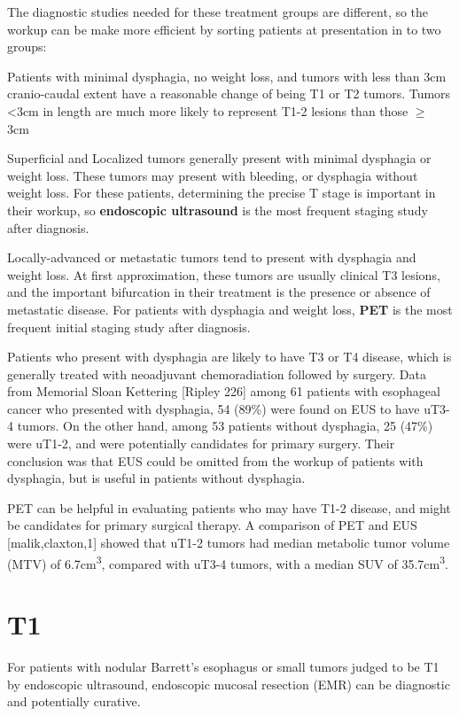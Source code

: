 \documentclass[
]{book}
\begin{document}
The diagnostic studies needed for these treatment groups are different, so the workup can be make more efficient by sorting patients at presentation in to two groups:

Patients with minimal dysphagia, no weight loss, and tumors with less than 3cm cranio-caudal extent have a reasonable change of being T1 or T2 tumors. Tumors \textless3cm in length are much more likely to represent T1-2 lesions than those \(\geq\) 3cm\citep{hollis1116}

Superficial and Localized tumors generally present with minimal dysphagia or weight loss. These tumors may present with bleeding, or dysphagia without weight loss. For these patients, determining the precise T stage is important in their workup, so \textbf{endoscopic ultrasound} is the most frequent staging study after diagnosis.

Locally-advanced or metastatic tumors tend to present with dysphagia and weight loss. At first approximation, these tumors are usually clinical T3 lesions, and the important bifurcation in their treatment is the presence or absence of metastatic disease. For patients with dysphagia and weight loss, \textbf{PET} is the most frequent initial staging study after diagnosis.

Patients who present with dysphagia are likely to have T3 or T4 disease, which is generally treated with neoadjuvant chemoradiation followed by surgery. Data from Memorial Sloan Kettering {[}Ripley 226{]} among 61 patients with esophageal cancer who presented with dysphagia, 54 (89\%) were found on EUS to have uT3-4 tumors. On the other hand, among 53 patients without dysphagia, 25 (47\%) were uT1-2, and were potentially candidates for primary surgery. Their conclusion was that EUS could be omitted from the workup of patients with dysphagia, but is useful in patients without dysphagia.

PET can be helpful in evaluating patients who may have T1-2 disease, and might be candidates for primary surgical therapy. A comparison of PET and EUS {[}malik,claxton,1{]} showed that uT1-2 tumors had median metabolic tumor volume (MTV) of 6.7cm\textsuperscript{3}, compared with uT3-4 tumors, with a median SUV of 35.7cm\textsuperscript{3}.

\hypertarget{t1}{%
\section{T1}\label{t1}}

For patients with nodular Barrett's esophagus or small tumors judged to be T1 by endoscopic ultrasound, endoscopic mucosal resection (EMR) can be diagnostic and potentially curative.\citep{pech652}
\end{document}
